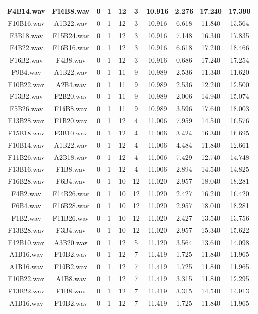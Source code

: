 \documentclass[11pt,a4paper,twoside]{book}
\begin{document}
\begin{longtable}[c]{|c|c|c|c|c|c|c|c|c|c|}
F4B14.wav&F16B8.wav&0&1&12&3&10.916&2.276&17.240&17.390\\ \hline
F10B16.wav&A1B22.wav&0&1&12&3&10.916&6.618&11.840&13.564\\ \hline
F3B18.wav&F15B24.wav&0&1&12&3&10.916&7.148&16.340&17.835\\ \hline
F4B22.wav&F16B16.wav&0&1&12&3&10.916&6.618&17.240&18.466\\ \hline
F16B2.wav&F4B8.wav&0&1&12&3&10.916&0.686&17.240&17.254\\ \hline
F9B4.wav&A1B22.wav&0&1&11&9&10.989&2.536&11.340&11.620\\ \hline
F10B22.wav&A2B4.wav&0&1&11&9&10.989&2.536&12.240&12.500\\ \hline
F13B2.wav&F2B20.wav&0&1&11&9&10.989&2.006&14.940&15.074\\ \hline
F5B26.wav&F16B8.wav&0&1&11&9&10.989&3.596&17.640&18.003\\ \hline
F13B28.wav&F1B20.wav&0&1&12&4&11.006&7.959&14.540&16.576\\ \hline
F15B18.wav&F3B10.wav&0&1&12&4&11.006&3.424&16.340&16.695\\ \hline
F10B14.wav&A1B22.wav&0&1&12&4&11.006&4.484&11.840&12.661\\ \hline
F11B26.wav&A2B18.wav&0&1&12&4&11.006&7.429&12.740&14.748\\ \hline
F13B16.wav&F1B8.wav&0&1&12&4&11.006&2.894&14.540&14.825\\ \hline
F16B28.wav&F6B4.wav&0&1&10&12&11.020&2.957&18.040&18.281\\ \hline
F4B2.wav&F14B26.wav&0&1&10&12&11.020&2.427&16.240&16.420\\ \hline
F6B4.wav&F16B28.wav&0&1&10&12&11.020&2.957&18.040&18.281\\ \hline
F1B2.wav&F11B26.wav&0&1&10&12&11.020&2.427&13.540&13.756\\ \hline
F13B28.wav&F3B4.wav&0&1&10&12&11.020&2.957&15.340&15.622\\ \hline
F12B10.wav&A3B20.wav&0&1&12&5&11.120&3.564&13.640&14.098\\ \hline
A1B16.wav&F10B2.wav&0&1&12&7&11.419&1.725&11.840&11.965\\ \hline
A1B16.wav&F10B2.wav&0&1&12&7&11.419&1.725&11.840&11.965\\ \hline
F10B22.wav&A1B8.wav&0&1&12&7&11.419&3.315&11.840&12.295\\ \hline
F13B22.wav&F1B8.wav&0&1&12&7&11.419&3.315&14.540&14.913\\ \hline
A1B16.wav&F10B2.wav&0&1&12&7&11.419&1.725&11.840&11.965\\ \hline

\end{longtable}
\end{document}

